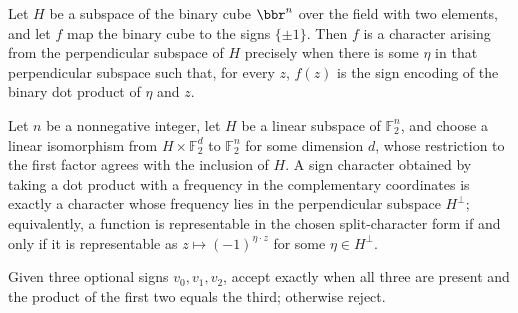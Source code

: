 \begin{definition}
\label{FABL.IsPerpendicularCharacter}
\leanok
{}
Let $H$ be a subspace of the binary cube $\bbr^n$ over the field with two elements, and
let $f$ map the binary cube to the signs $\{\pm1\}$. Then $f$ is a character arising
from the perpendicular subspace of $H$ precisely when there is some $\eta$ in that
perpendicular subspace such that, for every $z$, $f(z)$ is the sign encoding of the
binary dot product of $\eta$ and $z$.
\end{definition}

\begin{theorem}
\label{FABL.isSplitCharacter_iff_isPerpendicularCharacter}
\leanok
{}
Let $n$ be a nonnegative integer, let $H$ be a linear subspace of $\mathbb F_2^n$, and
choose a linear isomorphism from $H\times\mathbb F_2^d$ to $\mathbb F_2^n$ for some
dimension $d$, whose restriction to the first factor agrees with the inclusion of $H$. A
sign character obtained by taking a dot product with a frequency in the complementary
coordinates is exactly a character whose frequency lies in the perpendicular subspace
$H^\perp$; equivalently, a function is representable in the chosen split-character form
if and only if it is representable as $z\mapsto(-1)^{\eta\cdot z}$ for some $\eta\in
H^\perp$.
\end{theorem}

\begin{definition}
\label{FABL.splitCharacterTranscriptAccept}
\leanok
{}
Given three optional signs $v_0,v_1,v_2$, accept exactly when all three are present and
the product of the first two equals the third; otherwise reject.
\end{definition}


